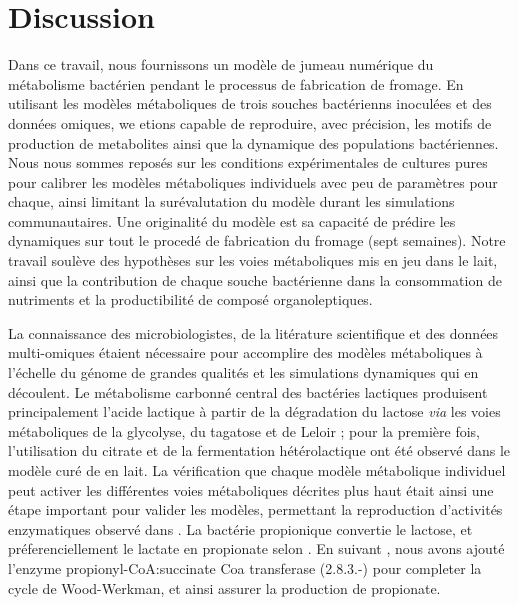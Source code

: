 \documentclass[../main.tex]{subfiles}
\begin{document}
\newpage    

\section{Discussion}

Dans ce travail, nous fournissons un modèle de jumeau numérique du métabolisme bactérien pendant le processus de fabrication de fromage. En utilisant les modèles métaboliques de trois souches bactérienns inoculées et des données omiques, we etions capable de reproduire, avec précision, les motifs de production de metabolites ainsi que la dynamique des populations bactériennes. Nous nous sommes reposés sur les conditions expérimentales de cultures pures pour calibrer les modèles métaboliques individuels avec peu de paramètres pour chaque, ainsi limitant la surévalutation  du modèle durant les simulations communautaires. Une originalité du modèle est sa capacité de prédire les dynamiques sur tout le procedé de fabrication du fromage (sept semaines). Notre travail soulève des hypothèses sur les voies métaboliques mis en jeu dans le lait, ainsi que la contribution de chaque souche bactérienne dans la consommation de nutriments et la productibilité de composé organoleptiques.

La connaissance des microbiologistes, de la litérature scientifique et des données multi-omiques étaient nécessaire pour accomplire des modèles métaboliques à l'échelle du génome de grandes qualités et les simulations dynamiques qui en découlent. Le métabolisme carbonné central des bactéries lactiques produisent principalement l'acide lactique à partir de la dégradation du lactose \textit{via} les voies métaboliques de la glycolyse, du tagatose et de Leloir \citep{Widyastuti2014,VanRooijen1991,Kleerebezem2003}; pour la première fois, l'utilisation du citrate et de la fermentation hétérolactique ont été observé dans le modèle curé de \plantarum en lait. La vérification que chaque modèle métabolique individuel peut activer les différentes voies métaboliques décrites plus haut était ainsi une étape important pour valider les modèles, permettant la reproduction d'activités enzymatiques observé dans \citep{Quatravaux2006,Carroll1999}. La bactérie propionique \freud convertie le lactose, et préferenciellement le lactate en propionate selon \citep{Loux2015,Thierry2011}. En suivant \citep{Borghei2021}, nous avons ajouté l'enzyme propionyl-CoA:succinate Coa transferase (2.8.3.-) pour completer la cycle de Wood-Werkman, et ainsi assurer la production de propionate.
\end{document}
